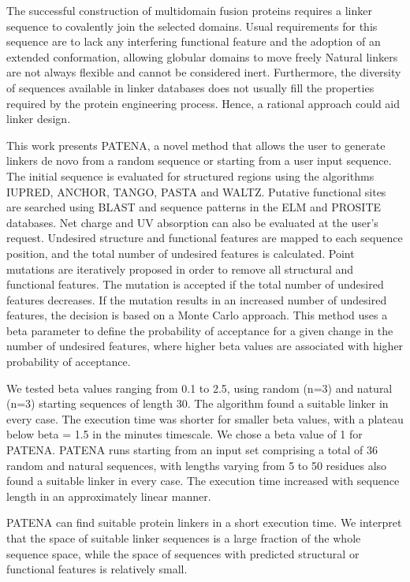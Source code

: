 
The successful construction of multidomain fusion proteins requires a linker sequence to covalently join the
selected domains. Usual requirements for this sequence are to lack any interfering functional feature and the
adoption of an extended conformation, allowing globular domains to move freely
Natural linkers are not always flexible and cannot be considered inert. Furthermore, the diversity of sequences
available in linker databases does not usually fill the properties required by the protein engineering process.
Hence, a rational approach could aid linker design.

This work presents PATENA, a novel method that allows the user to generate linkers de novo from a random 
sequence or starting from a user input sequence.
The initial sequence is evaluated for structured regions using the algorithms IUPRED, ANCHOR, TANGO, PASTA
and WALTZ. Putative functional sites are searched using BLAST and sequence patterns in the ELM and
PROSITE databases. Net charge and UV absorption can also be evaluated at the user’s request. Undesired
structure and functional features are mapped to each sequence position, and the total number of undesired
features is calculated.
Point mutations are iteratively proposed in order to remove all structural and functional features. The mutation is
accepted if the total number of undesired features decreases. If the mutation results in an increased number of
undesired features, the decision is based on a Monte Carlo approach. This method uses a beta parameter to
define the probability of acceptance for a given change in the number of undesired features, where higher beta
values are associated with higher probability of acceptance.

We tested beta values ranging from 0.1 to 2.5, using random (n=3) and natural (n=3) starting sequences of length
30. The algorithm found a suitable linker in every case. The execution time was shorter for smaller beta values,
with a plateau below beta = 1.5 in the minutes timescale. We chose a beta value of 1 for PATENA.
PATENA runs starting from an input set comprising a total of 36 random and natural sequences, with lengths
varying from 5 to 50 residues also found a suitable linker in every case. The execution time increased with
sequence length in an approximately linear manner.

PATENA can find suitable protein linkers in a short execution time. We interpret that the space of suitable linker
sequences is a large fraction of the whole sequence space, while the space of sequences with predicted
structural or functional features is relatively small.
